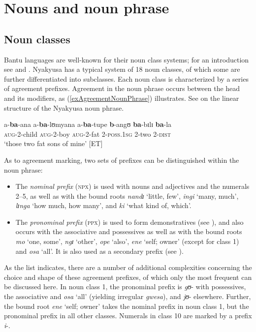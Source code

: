 \section{Nouns and noun phrase}
\subsection{Noun classes}\label{NounClasses}
Bantu languages are well-known for their noun class systems; for an introduction see \citet[ch. 3]{MahoJ1999} and \citet{KatambaF2003}. Nyakyusa has a typical system of 18 noun classes, of which some are further differentiated into subclasses. Each noun class is characterized by a series of agreement prefixes. Agreement in the noun phrase occurs between the head and its modifiers, as (\ref{exAgreementNounPhrase}) illustrates. See \citet{LusekeloA2009a} on the linear structure of the Nyakyusa noun phrase.

\begin{exe}
	\ex\label{exAgreementNounPhrase}
	\gll a-\textbf{ba}-ana a-\textbf{ba}-lʊmyana a-\textbf{ba}-tupe \textbf{b}-angʊ \textbf{ba}-bɪlɪ \textbf{ba}-la\\
	\textsc{aug}-2-child \textsc{aug}-2-boy \textsc{aug}-2-fat 2-\textsc{poss.1sg} 2-two  2-\textsc{dist}\\
	\glt `those two fat sons of mine' [ET]
\end{exe}

As to agreement marking, two sets of prefixes can be distinguished within the noun phrase:

\begin{itemize}
	\item The \textit{nominal prefix} (\textsc{npx}) is used with nouns and adjectives and the numerals 2--5, as well as with the bound roots \textit{nandɪ} `little, few', \textit{ingi} `many, much', \textit{lɪnga} `how much, how many', and \textit{ki} `what kind of, which'.
	\item The \textit{pronominal prefix} (\textsc{ppx}) is used to form demonstratives (see ), and also occurs with the associative and possessives as well as with the bound roots \textit{mo} `one, some', \textit{ngɪ} `other', \textit{ope} `also', \textit{ene} `self; owner' (except for class 1) and \textit{osa} `all'. It is also used as a secondary prefix (see ).
\end{itemize}

As the list indicates, there are a number of additional complexities concerning the choice and shape of these agreement prefixes, of which only the most frequent can be discussed here. In noun class 1, the pronominal prefix is \textit{gʊ}- with possessives, the associative and \textit{osa} `all' (yielding irregular \textit{gwesa}), and \textit{jʊ}- elsewhere. Further, the bound root \textit{ene} `self; owner' takes the nominal prefix in noun class 1, but the pronominal prefix in all other classes. Numerals in class 10 are marked by a prefix \textit{i}-.

